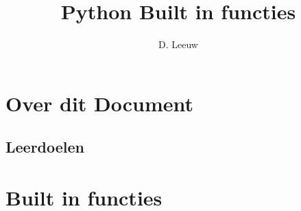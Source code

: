 \documentclass[a4paper,12pt,twoside,openright,titlepage]{article}
\author{D. Leeuw}
\title{Python Built in functies}
\date{\today\\
0.5.0\\
\vfill
\raggedright
\copyright\ 2025 Dennis Leeuw\\
}
\begin{document}

\maketitle


\section{Over dit Document}
\subsection{Leerdoelen}



\section{Built in functies}

%
%

\printindex
\end{document}
